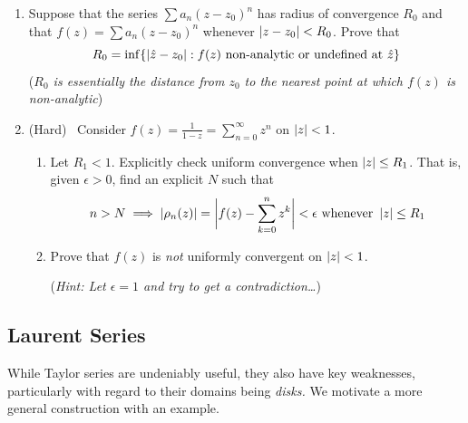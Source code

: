 \begin{exercises*}
\begin{enumerate}
	\item\label{exs:raddistnonanalytic} Suppose that the series $\sum a_n(z-z_0)^n$ has radius of convergence $R_0$ and that $f(z)=\sum a_n(z-z_0)^n$ whenever $\left| z-z_0\right|<R_0$. Prove that
	\[R_0=\inf\{\left| \hat z-z_0\right|:f(z)\text{ non-analytic or undefined at $\hat z$}\}\]
	(\emph{$R_0$ is essentially the distance from $z_0$ to the nearest point at which $f(z)$ is non-analytic})
	
	\item\label{ex:notuniform} (Hard) \ Consider $f(z)=\frac 1{1-z}=\sum\limits_{n=0}^\infty z^n$ on $\left| z\right|<1$.
	\begin{enumerate}
	  \item Let $R_1<1$. Explicitly check uniform convergence when $\left| z\right|\le R_1$. That is, given $\epsilon>0$, find an explicit $N$ such that
	  \[n>N\implies \left| \rho_n(z)\right|=\biggl|f(z)-\sum_{k=0}^nz^k\biggr|<\epsilon\text{ whenever }\left| z\right|\le R_1\]
	  \item Prove that $f(z)$ is \emph{not} uniformly convergent on $\left| z\right|<1$.\par
	  (\emph{Hint: Let $\epsilon=1$ and try to get a contradiction\ldots})
	\end{enumerate}
\end{enumerate}
\end{exercises*}\clearpage


\subsection{Laurent Series}

While Taylor series are undeniably useful, they also have key weaknesses, particularly with regard to their domains being \emph{disks.} We motivate a more general construction with an example.

